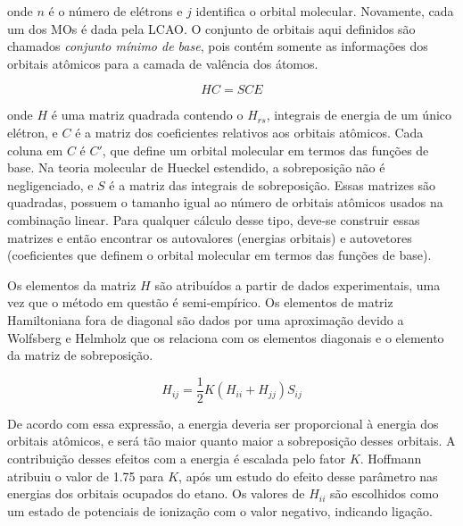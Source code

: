 \noindent onde $n$ é o número de elétrons e $j$ identifica o orbital molecular. Novamente, cada um dos \gls{MOs} é dada pela LCAO. O conjunto de orbitais aqui definidos são chamados \textit{conjunto mínimo de base}, pois contém somente as informações dos orbitais atômicos para a camada de valência dos átomos. 

\begin{equation}
    HC = SCE
\end{equation}

\noindent onde $H$ é uma matriz quadrada contendo o $H_{rs}$, integrais de energia de um único elétron, e $C$ é a matriz dos coeficientes relativos aos orbitais atômicos. Cada coluna em $C$ é $C'$, que define um orbital molecular em termos das funções de base. Na teoria molecular de Hueckel estendido, a sobreposição não é negligenciado, e $S$ é a matriz das integrais de sobreposição. Essas matrizes são quadradas, possuem o tamanho igual ao número de orbitais atômicos usados na combinação linear. Para qualquer cálculo desse tipo, deve-se construir essas matrizes e então encontrar os autovalores (energias orbitais) e autovetores (coeficientes que definem o orbital molecular em termos das funções de base).

Os elementos da matriz $H$ são atribuídos a partir de dados experimentais, uma vez que o método em questão é semi-empírico. Os elementos de matriz Hamiltoniana fora de diagonal são dados por uma aproximação devido a Wolfsberg e Helmholz
que os relaciona com os elementos diagonais e o elemento da matriz de sobreposição.

\begin{equation}
    H_{ij} = \frac{1}{2} K(H_{ii} + H_{jj}) S_{ij}
\end{equation}

De acordo com essa expressão, a energia deveria ser proporcional à energia dos orbitais atômicos, e será tão maior quanto maior a sobreposição desses orbitais. A contribuição desses efeitos com a energia é escalada pelo fator $K$. Hoffmann atribuiu o valor de 1.75 para $K$, após um estudo do efeito desse parâmetro nas energias dos orbitais ocupados do etano. Os valores de $H_{ii}$ são escolhidos como um estado de potenciais de ionização com o valor negativo, indicando ligação.

